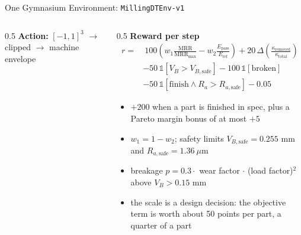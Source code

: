 ﻿\documentclass[11pt,aspectratio=169]{beamer}
\newcommand{\MRR}{\mathrm{MRR}}
\newcommand{\Ra}{R_a}
\newcommand{\RaSafe}{R_{a,\text{safe}}}
\newcommand{\VB}{V_B}
\newcommand{\VBSafe}{V_{B,\text{safe}}}
\begin{document}
\begin{frame}{One Gymnasium Environment: \texttt{MillingDTEnv-v1}}
\begin{columns}[T]
\begin{column}{0.5\textwidth}
            \textbf{Action:} $[-1,1]^3$ $\to$ clipped $\to$ machine envelope
        \end{column}
        \begin{column}{0.5\textwidth}
            \textbf{Reward per step}
            \setlength{\jot}{3pt}
            \begin{align}
                r = &\ 100\left(w_1 \frac{\MRR}{\MRR_\text{max}} - w_2 \frac{E_\text{pass}}{E_\text{ref}}\right)
                    + 20\,\Delta\!\left(\tfrac{\kappa_\text{removed}}{\kappa_\text{total}}\right) \\
                    &- 50\,\mathbb{1}[\VB > \VBSafe] - 100\,\mathbb{1}[\text{broken}] \\
                    &- 50\,\mathbb{1}[\text{finish} \wedge \Ra > \RaSafe] - 0.05
            \end{align}
            \vspace{0.2em}
            \begin{itemize}
                \item $+200$ when a part is finished in spec, plus a Pareto margin bonus of at most $+5$
                \item $w_1 = 1 - w_2$; safety limits $\VBSafe = 0.255$ mm and $\RaSafe = 1.36\ \mu$m
                \item breakage $p = 0.3 \cdot$ wear factor $\cdot$ (load factor)$^2$ above $\VB > 0.15$ mm
                \item \alert{the scale is a design decision}: the objective term is worth about 50 points per part, a quarter of a part
            \end{itemize}
        \end{column}
    \end{columns}
\end{frame}
\end{document}
